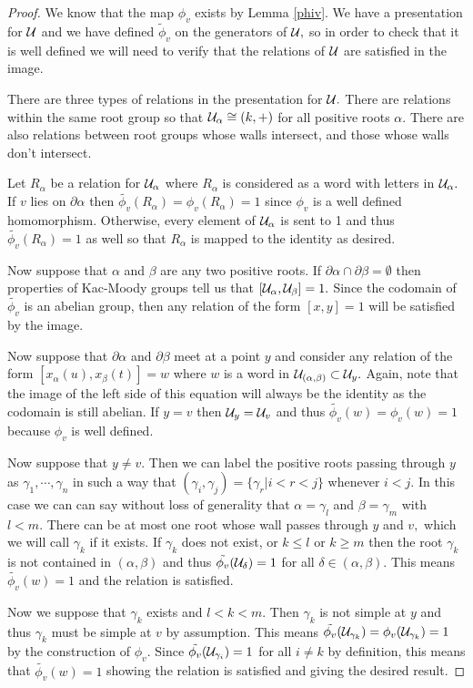 \documentclass[class=book, crop=false,12 pt]{standalone}
\begin{document}
\begin{proof}
	We know that the map $\phi_v$ exists by Lemma \ref{phiv}. We have a presentation for $\mathcal{U}$ and we have defined $\tilde{\phi}_v$ on the generators of $\mathcal{U},$ so in order to check that it is well defined we will need to verify that the relations of $\mathcal{U}$ are satisfied in the image.

	There are three types of relations in the presentation for $\mathcal{U}.$ There are relations within the same root group so that $\mathcal{U}_\alpha\cong (k,+)$ for all positive roots $\alpha.$ There are also relations between root groups whose walls intersect, and those whose walls don't intersect.

	Let $R_\alpha$ be a relation for $\mathcal{U}_\alpha$ where $R_\alpha$ is considered as a word with letters in $\mathcal{U}_\alpha.$ If $v$ lies on $\partial \alpha$ then $\tilde{\phi_v}(R_\alpha)=\phi_v(R_\alpha)=1$ since $\phi_v$ is a well defined homomorphism. Otherwise, every element of $\mathcal{U}_\alpha$ is sent to 1 and thus $\tilde{\phi_v}(R_\alpha)=1$ as well so that $R_\alpha$ is mapped to the identity as desired.

	Now suppose that $\alpha$ and $\beta$ are any two positive roots. If $\partial \alpha \cap \partial \beta=\emptyset$ then properties of Kac-Moody groups tell us that $[\mathcal{U}_\alpha,\mathcal{U}_\beta]=1.$ Since the codomain of $\tilde{\phi_v}$ is an abelian group, then any relation of the form $[x,y]=1$ will be satisfied by the image.


	Now suppose that $\partial \alpha$ and $\partial \beta$ meet at a point $y$ and consider any relation of the form $[x_\alpha(u),x_\beta(t)]=w$ where $w$ is a word in $\mathcal{U}_{(\alpha,\beta)}\subset \mathcal{U}_y.$ Again, note that the image of the left side of this equation will always be the identity as the codomain is still abelian. If $y=v$ then $\mathcal{U}_y=\mathcal{U}_v$ and thus $\tilde{\phi_v}(w)=\phi_v(w)=1$ because $\phi_v$ is well defined.

	Now suppose that $y\neq v.$ Then we can label the positive roots passing through $y$ as $\gamma_1,\cdots,\gamma_n$ in such a way that $(\gamma_i,\gamma_j)=\{\gamma_{r}|i<r<j\}$ whenever $i<j.$ In this case we can can say without loss of generality that $\alpha=\gamma_l$ and $\beta=\gamma_m$ with $l<m.$  There can be at most one root whose wall passes through $y$ and $v,$ which we will call $\gamma_k$ if it exists. If $\gamma_k$ does not exist, or $k\le l$ or $k\ge m$ then the root $\gamma_k$ is not contained in $(\alpha,\beta)$ and thus $\tilde{\phi_v}(\mathcal{U}_\delta)=1$ for all $\delta\in (\alpha,\beta).$ This means $\tilde{\phi_v}(w)=1$ and the relation is satisfied.

	Now we suppose that $\gamma_k$ exists and $l<k<m.$ Then $\gamma_k$ is not simple at $y$ and thus $\gamma_k$ must be simple at $v$ by assumption. This means $\tilde{\phi_v}(\mathcal{U}_{\gamma_k})=\phi_v(\mathcal{U}_{\gamma_k})=1$ by the construction of $\phi_v.$ Since $\tilde{\phi_v}(\mathcal{U}_{\gamma_i})=1$ for all $i\neq k$ by definition, this means that $\tilde{\phi_v}(w)=1$ showing the relation is satisfied and giving the desired result.
\end{proof}
\end{document}
